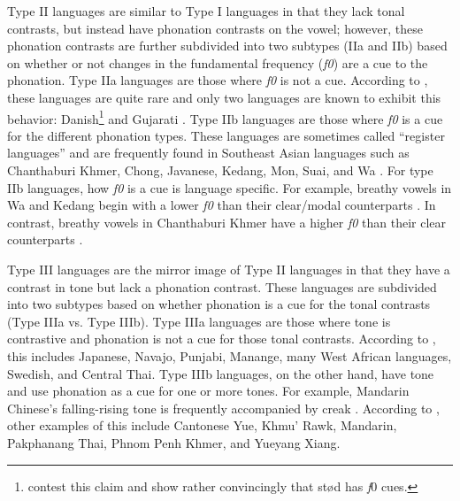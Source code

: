 Type II languages are similar to Type I languages in that they lack tonal contrasts, but instead have phonation contrasts on the vowel; however, these phonation contrasts are further subdivided into two subtypes (IIa and IIb) based on whether or not changes in the fundamental frequency (\textit{f0}) are a cue to the phonation. Type IIa languages are those where \textit{f0} is not a cue. According to \citet{espositoCrosslinguisticPatternsPhonation2020}, these languages are quite rare and only two languages are known to exhibit this behavior: Danish\footnote{\citet{frazierPhoneticsYucatecMaya2013,penaStodTimingDomain2022,penaProductionPerceptionStod2024} contest this claim and show rather convincingly that stød has \textit{f}0 cues.} \citep{gronnumDanishStodLaryngealization2013} and Gujarati \citep{khanPhoneticsContrastivePhonation2012}. Type IIb languages are those where \textit{f0} is a cue for the different phonation types. These languages are sometimes called ``register languages'' and are frequently found in Southeast Asian languages such as Chanthaburi Khmer, Chong, Javanese, Kedang, Mon, Suai, and Wa \citep[e.g.,][]{brunelleTonePhonationSoutheast2016,dicanioPhoneticsRegisterTakhian2009,samelyKedangEasternIndonesia1991,waylandAcousticCorrelatesBreathy2003}. For type IIb languages, how \textit{f0} is a cue is language specific. For example, breathy vowels in Wa and Kedang begin with a lower \textit{f0} than their clear/modal counterparts \citep{samelyKedangEasternIndonesia1991}. In contrast, breathy vowels in Chanthaburi Khmer have a higher \textit{f0} than their clear counterparts \citep{waylandAcousticCorrelatesBreathy2003}. 

Type III languages are the mirror image of Type II languages in that they have a contrast in tone but lack a phonation contrast. These languages are subdivided into two subtypes based on whether phonation is a cue for the tonal contrasts (Type IIIa vs. Type IIIb). Type IIIa languages are those where tone is contrastive and phonation is not a cue for those tonal contrasts. According to \citep{espositoCrosslinguisticPatternsPhonation2020}, this includes Japanese, Navajo, Punjabi, Manange, many West African languages, Swedish, and Central Thai. Type IIIb languages, on the other hand, have tone and use phonation as a cue for one or more tones. For example, Mandarin Chinese's falling-rising tone is frequently accompanied by creak \citep[e.g.,][]{belotel-greniePhonationTypesAnalysis1994,belotel-grenieTypesPhonationTons1997,belotel-grenieCreakyVoicePhonation2004,hockettPeipingPhonology1947}. According to \citep{espositoCrosslinguisticPatternsPhonation2020}, other examples of this include Cantonese Yue, Khmu' Rawk, Mandarin, Pakphanang Thai, Phnom Penh Khmer, and Yueyang Xiang.

